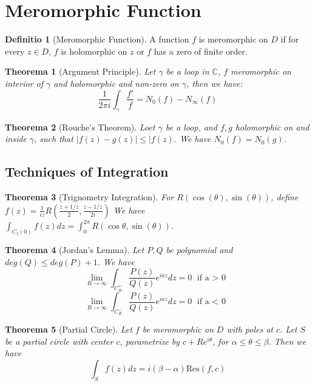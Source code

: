 \documentclass[12pt, a4paper]{article}
\newtheorem{theorem}{Theorema}[section]
\theoremstyle{definition}
\newtheorem{definition}{Definitio}[section]
\theoremstyle{remark}
\newcommand{\bb}[1]{\mathbb{#1}}
\newcommand{\res}{\text{Res}}
\begin{document}
\section{Meromorphic Function} %
\label{sec:Meromorphic Function}


\begin{definition}[Meromorphic Function]
  A function $f$ is meromorphic on $D$ if for every $z \in D$, $f$ is holomorphic on $z$ or $f$ has a zero of finite order. 
\end{definition}

\begin{theorem}[Argument Principle]
  Let $\gamma$ be a loop in $\bb{C}$, $f$ meromorphic on interior of $\gamma$ and holomorphic and non-zero on $\gamma$, then we have: 
  \[
    \frac{1}{2\pi i} \int_{\gamma} \frac{f'}{f} = N_0(f) - N_{\infty}(f)
  \]
\end{theorem}

\begin{theorem}[Rouche's Theorem]
  Loet $\gamma$ be a loop, and $f,g$ holomorphic on and inside $\gamma$, such that $|f(z) - g(z)| \leq |f(z)$. We have $N_0(f) = N_0(g)$.
\end{theorem}


\subsection{Techniques of Integration} %
\label{sec:Techniques of Integration}

\begin{theorem}[Trignometry Integration]
For $ R(\cos(\theta), \sin(\theta))$, define $f(z) = \frac{1}{iz}R(\frac{z+1/z}{2}, \frac{z-1/z}{2i})$
We have $ \int_{C_1(0)} f(z) dz = \int^{2\pi}_{0} R(\cos{\theta}, \sin(\theta))$.
\end{theorem}

\begin{theorem}[Jordan's Lemma]
	Let $P,Q$ be polynomial and $deg(Q) \leq deg(P) + 1$. We have 
	$$
	\lim_{R \rightarrow  \infty} \int_{C_R^+} \frac{P(z)}{Q(z)} e^{iaz} dz = 0 \text{ if  a $>$ 0 }
	$$
	$$
	\lim_{R \rightarrow  \infty} \int_{C_R^-} \frac{P(z)}{Q(z)} e^{iaz} dz = 0 \text{ if a $<$ 0 }
	$$
\end{theorem}

\begin{theorem}[Partial Circle]
	Let $f$ be meromorphic on $D$ with poles at $c$. Let $S$ be a partial circle with center $c$, parametrize by $c + Re^{i\theta}$, for $\alpha \leq \theta \leq \beta$. Then we have 
	$$
	\int_{S} f(z) dz = i (\beta - \alpha) \res(f, c)
	$$
\end{theorem}
\end{document}
